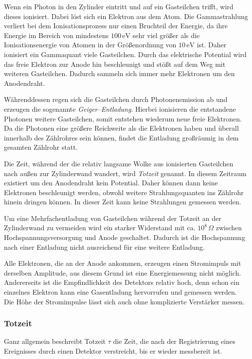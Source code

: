 \documentclass[12pt,a4paper]{scrartcl}
\numberwithin{equation}{section} %
\begin{document}
Wenn ein Photon in den Zylinder eintritt und auf ein Gasteilchen trifft, wird dieses ionisiert. Dabei löst sich ein Elektron aus dem Atom. Die Gammastrahlung verliert bei dem Ionisationsprozess nur einen Bruchteil der Energie, da ihre Energie im Bereich von mindestens $100\mathrm{\,eV}$ sehr viel größer als die Ionisationsenergie von Atomen in der Größenordnung von $10\mathrm{\,eV}$ ist. Daher ionisiert ein Gammaquant viele Gasteilchen. \cite{Demtröder Kern/Atom} Durch das elektrische Potential wird das freie Elektron zur Anode hin beschleunigt und stößt auf dem Weg mit weiteren Gasteilchen. Dadurch sammeln sich immer mehr Elektronen um den Anodendraht.

Währenddessen regen sich die Gasteilchen durch Photonenemission ab und erzeugen die sogenannte \emph{Geiger--Entladung}. Hierbei ionisieren die entstandene Photonen weitere Gasteilchen, somit entstehen wiederum neue freie Elektronen. Da die Photonen eine größere Reichweite als die Elektronen haben und überall innerhalb des Zählrohres sein können, findet die Entladung großräumig in dem gesamten Zählrohr statt.

Die Zeit, während der die relativ langsame Wolke aus ionisierten Gasteilchen nach außen zur Zylinderwand wandert, wird \emph{Totzeit} genannt. In diesem Zeitraum existiert um den Anodendraht kein Potential. Daher können dann keine Elektronen beschleunigt werden, obwohl weitere Strahlungsquanten ins Zählrohr hinein dringen können. In dieser Zeit kann keine Strahlungen gemessen werden.

Um eine Mehrfachentladung von Gasteilchen während der Totzeit an der Zylinderwand zu vermeiden wird ein starker Widerstand mit ca. $10^8\,\Omega$ zwischen Hochspannungsversorgung und Anode geschaltet. Dadurch ist die Hochspannung nach einer Entladung nicht ausreichend für eine weitere Entladung.

Alle Elektronen, die an der Anode ankommen, erzeugen einen Stromimpuls mit derselben Amplitude, aus diesem Grund ist eine Energiemessung nicht möglich. Andererseits ist die Empfindlichkeit des Detektors relativ hoch, denn schon ein einzelnes Elektron kann eine Gasentladung hervorrufen und gemessen werden. Die Höhe der Stromimpulse lässt sich auch ohne komplizierte Verstärker messen.

\subsubsection{Totzeit}
\label{Totzeit}
Ganz allgemein beschreibt Totzeit $\tau$ die Zeit, die nach der Registrierung eines Ereignisses durch einen Detektor verstreicht, bis er wieder messbereit ist. \cite{Totzeit}
\end{document}
